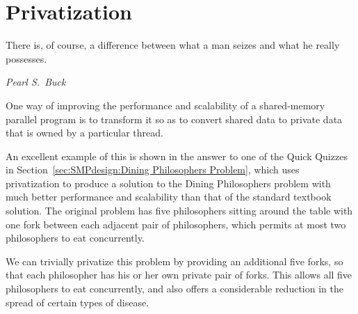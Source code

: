 \QuickQuizEnd

\section{Privatization}
\label{sec:owned:Privatization}
%
\epigraph{There is, of course, a difference between what a man seizes
	  and what he really possesses.}
	 {\emph{Pearl S.~Buck}}

One way of improving the performance and scalability of a shared-memory
parallel program is to transform it so as to convert shared data to
private data that is owned by a particular thread.

An excellent example of this is shown in the answer to one of the
Quick Quizzes in
Section~\ref{sec:SMPdesign:Dining Philosophers Problem},
which uses privatization to produce a solution to the
Dining Philosophers problem with much better performance and scalability
than that of the standard textbook solution.
The original problem has five philosophers sitting around the table
with one fork between each adjacent pair of philosophers, which permits
at most two philosophers to eat concurrently.

We can trivially privatize this problem by providing an additional five
forks, so that each philosopher has his or her own private pair of forks.
This allows all five philosophers to eat concurrently, and also offers
a considerable reduction in the spread of certain types of disease.

